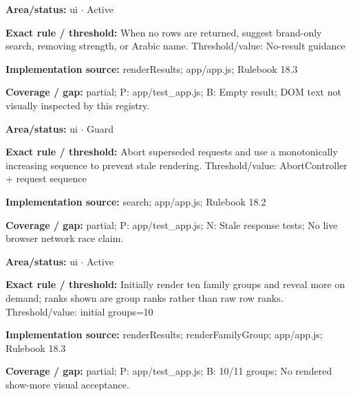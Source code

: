 \begin{tcolorbox}[enhanced,breakable,colback=white,colframe=Muted!45,boxrule=0.45pt,arc=1.5pt,left=6pt,right=6pt,top=5pt,bottom=5pt,title={\texttt{UI-NO-RESULT-10}},title after break={\texttt{UI-NO-RESULT-10}\ (continued)},fonttitle=\headingfont\bfseries\color{Navy},coltitle=Navy]
\textbf{Area/status:} ui $\boldsymbol{\cdot}$ Active\par
\smallskip
\textbf{Exact rule / threshold:} When no rows are returned, suggest brand-only search, removing strength, or Arabic name. Threshold/\allowbreak{}value: No-result guidance\par
\smallskip
\textbf{Implementation source:} renderResults; app/\allowbreak{}app.js; Rulebook 18.3\par
\smallskip
\textbf{Coverage / gap:} partial; P: app/\allowbreak{}test\_\allowbreak{}app.js; B: Empty result; DOM text not visually inspected by this registry.
\end{tcolorbox}
\begin{tcolorbox}[enhanced,breakable,colback=white,colframe=Muted!45,boxrule=0.45pt,arc=1.5pt,left=6pt,right=6pt,top=5pt,bottom=5pt,title={\texttt{UI-REQUEST-RACE-03}},title after break={\texttt{UI-REQUEST-RACE-03}\ (continued)},fonttitle=\headingfont\bfseries\color{Navy},coltitle=Navy]
\textbf{Area/status:} ui $\boldsymbol{\cdot}$ Guard\par
\smallskip
\textbf{Exact rule / threshold:} Abort superseded requests and use a monotonically increasing sequence to prevent stale rendering. Threshold/\allowbreak{}value: AbortController + request sequence\par
\smallskip
\textbf{Implementation source:} search; app/\allowbreak{}app.js; Rulebook 18.2\par
\smallskip
\textbf{Coverage / gap:} partial; P: app/\allowbreak{}test\_\allowbreak{}app.js; N: Stale response tests; No live browser network race claim.
\end{tcolorbox}
\begin{tcolorbox}[enhanced,breakable,colback=white,colframe=Muted!45,boxrule=0.45pt,arc=1.5pt,left=6pt,right=6pt,top=5pt,bottom=5pt,title={\texttt{UI-RESULT-PAGING-13}},title after break={\texttt{UI-RESULT-PAGING-13}\ (continued)},fonttitle=\headingfont\bfseries\color{Navy},coltitle=Navy]
\textbf{Area/status:} ui $\boldsymbol{\cdot}$ Active\par
\smallskip
\textbf{Exact rule / threshold:} Initially render ten family groups and reveal more on demand; ranks shown are group ranks rather than raw row ranks. Threshold/\allowbreak{}value: initial groups=10\par
\smallskip
\textbf{Implementation source:} renderResults; renderFamilyGroup; app/\allowbreak{}app.js; Rulebook 18.3\par
\smallskip
\textbf{Coverage / gap:} partial; P: app/\allowbreak{}test\_\allowbreak{}app.js; B: 10/\allowbreak{}11 groups; No rendered show-more visual acceptance.
\end{tcolorbox}
\medskip
